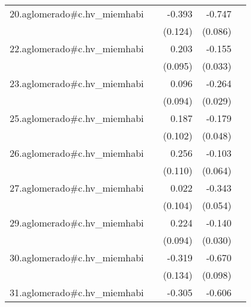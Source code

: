 {\begin{longtable}{l*{4}{D{.}{.}{-1}}}
\addlinespace
20.aglomerado#c.hv\_miemhabi&                     &      -0.393\sym{**} &      -0.747\sym{***}&                     \\
            &                     &     (0.124)         &     (0.086)         &                     \\
\addlinespace
22.aglomerado#c.hv\_miemhabi&                     &       0.203\sym{*}  &      -0.155\sym{***}&                     \\
            &                     &     (0.095)         &     (0.033)         &                     \\
\addlinespace
23.aglomerado#c.hv\_miemhabi&                     &       0.096         &      -0.264\sym{***}&                     \\
            &                     &     (0.094)         &     (0.029)         &                     \\
\addlinespace
25.aglomerado#c.hv\_miemhabi&                     &       0.187         &      -0.179\sym{***}&                     \\
            &                     &     (0.102)         &     (0.048)         &                     \\
\addlinespace
26.aglomerado#c.hv\_miemhabi&                     &       0.256\sym{*}  &      -0.103         &                     \\
            &                     &     (0.110)         &     (0.064)         &                     \\
\addlinespace
27.aglomerado#c.hv\_miemhabi&                     &       0.022         &      -0.343\sym{***}&                     \\
            &                     &     (0.104)         &     (0.054)         &                     \\
\addlinespace
29.aglomerado#c.hv\_miemhabi&                     &       0.224\sym{*}  &      -0.140\sym{***}&                     \\
            &                     &     (0.094)         &     (0.030)         &                     \\
\addlinespace
30.aglomerado#c.hv\_miemhabi&                     &      -0.319\sym{*}  &      -0.670\sym{***}&                     \\
            &                     &     (0.134)         &     (0.098)         &                     \\
\addlinespace
31.aglomerado#c.hv\_miemhabi&                     &      -0.305\sym{*}  &      -0.606\sym{***}&                     \\

\end{longtable}}
